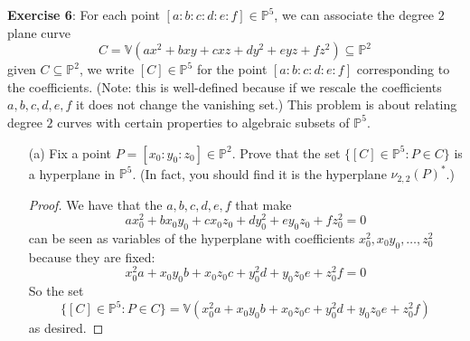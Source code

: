 \documentclass{article}
\begin{document}
\textbf{Exercise 6}: For each point $[a : b : c : d : e : f] \in \mathbb{P}^{5}$, we can associate the degree $2$ plane curve
    \begin{equation*}
        C = \mathbb{V}(ax^{2} + bxy + cxz + dy^{2} + eyz + fz^{2}) \subseteq \mathbb{P}^{2}
    \end{equation*}
given $C \subseteq \mathbb{P}^{2}$, we write $[C] \in \mathbb{P}^{5}$ for the point $[a : b : c : d : e : f]$ corresponding to the coefficients. (Note: this is well-defined because if we rescale the coefficients $a, b, c, d, e, f$ it does not change the vanishing set.) This problem is about relating degree $2$ curves with certain properties to algebraic subsets of $\mathbb{P}^{5}$.
    \begin{itemize}
        \item [(a)] Fix a point $P = [x_{0} : y_{0} : z_{0}] \in \mathbb{P}^{2}$. Prove that the set $\{[C] \in \mathbb{P}^{5} : P \in C\}$ is a hyperplane in $\mathbb{P}^{5}$. (In fact, you should find it is the hyperplane $\nu_{2, 2}(P)^{*}$.)
            \begin{proof}
                We have that the $a, b, c, d, e, f$ that make
                    \begin{equation*}
                        ax_{0}^{2} + bx_{0}y_{0} + cx_{0}z_{0} + dy_{0}^{2} + ey_{0}z_{0} + fz_{0}^{2} = 0
                    \end{equation*}
                can be seen as variables of the hyperplane with coefficients $x_{0}^{2}, x_{0}y_{0}, \ldots, z_{ 0}^{2}$ because they are fixed:
                    \begin{equation*}
                        x_{0}^{2}a + x_{0}y_{0}b + x_{0}z_{0}c + y_{0}^{2}d + y_{0}z_{0}e + z_{0}^{2}f = 0
                    \end{equation*}
                So the set
                    \begin{equation*}
                        \{[C] \in \mathbb{P}^{5} : P \in C\} = \mathbb{V}(x_{0}^{2}a + x_{0}y_{0}b + x_{0}z_{0}c + y_{0}^{2}d + y_{0}z_{0}e + z_{0}^{2}f)
                    \end{equation*}
                as desired.
            \end{proof}


\end{itemize}
\end{document}
